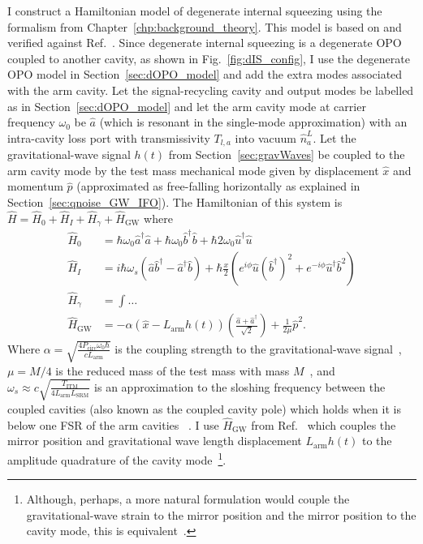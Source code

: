 I construct a Hamiltonian model of degenerate internal squeezing using the formalism from Chapter~\ref{chp:background_theory}. This model is based on and verified against Ref.~\cite{Korobko2019}. %
Since degenerate internal squeezing is a degenerate OPO coupled to another cavity, as shown in Fig.~\ref{fig:dIS_config}, I use the degenerate OPO model in Section~\ref{sec:dOPO_model} and add the extra modes associated with the arm cavity. Let the signal-recycling cavity and output modes be labelled as in Section~\ref{sec:dOPO_model} and let the arm cavity mode at carrier frequency $\omega_0$ be $\hat a$ (which is resonant in the single-mode approximation) with an intra-cavity loss port with transmissivity $T_{l,a}$ into vacuum $\hat n^L_a$. Let the gravitational-wave signal $h(t)$ from Section~\ref{sec:gravWaves} be coupled to the arm cavity mode by the test mass mechanical mode given by displacement $\hat x$ and momentum $\hat p$ (approximated as free-falling horizontally as explained in Section~\ref{sec:qnoise_GW_IFO}). 
The Hamiltonian of this system is $\hat H = \hat H_0 + \hat H_I + \hat H_\gamma + \hat H_\text{GW}$ where~\cite{}
\begin{align}
\hat H_0 &= \hbar \omega_0 \hat a^\dag \hat a + \hbar \omega_0 \hat b^\dag \hat b + \hbar 2\omega_0 \hat u^\dag \hat u\\
\hat H_I &= i\hbar\omega_s(\hat a\hat b^\dag-\hat a^\dag\hat b) +\hbar \frac{x}{2} (e^{i\phi} \hat u (\hat b^\dag)^2 + e^{-i\phi} \hat u^\dag \hat b^2)\\
\hat H_\gamma &= \int \ldots \\
\hat H_\text{GW} &= -\alpha (\hat{x}-L_\mathrm{arm}h(t))\left(\frac{\hat{a}+\hat{a}^\dag}{\sqrt{2}}\right)+\frac{1}{2\mu}\hat{p}^2.
\end{align}
Where $\alpha=\sqrt{\frac{4 P_\text{circ} \omega_0 \hbar}{c  L_\text{arm}}}$  is the coupling strength to the gravitational-wave signal~\cite{}, $\mu=M/4$ is the reduced mass of the test mass with mass $M$~\cite{}, and $\omega_s\approx c\sqrt{\frac{T_\text{ITM}}{4 L_\text{arm} L_\text{SRM}}}$ is an approximation to the sloshing frequency between the coupled cavities (also known as the coupled cavity pole) which holds when it is below one FSR of the arm cavities ~\cite{}. I use $\hat H_\text{GW}$ from Ref.~\cite{Li2020,original source?} which couples the mirror position and gravitational wave length displacement $L_\text{arm} h(t)$ to the amplitude quadrature of the cavity mode~\footnote{Although, perhaps, a more natural formulation would couple the gravitational-wave strain to the mirror position and the mirror position to the cavity mode, this is equivalent~\cite{}.}. 
